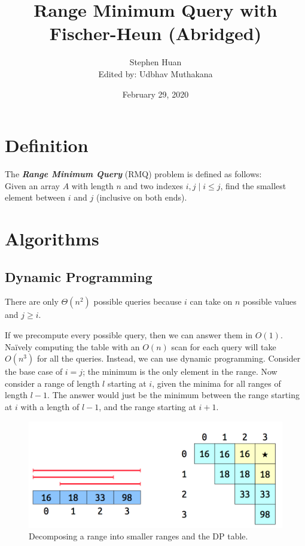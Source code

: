 \documentclass[11pt, oneside]{article}
\title{Range Minimum Query with Fischer-Heun (Abridged)}
\author{Stephen Huan\\ Edited by: Udbhav Muthakana}
\date{February 29, 2020}
\newcommand{\emphasis}[1]{\textbf{\textit{#1}}}
\begin{document}
\maketitle

\section{Definition}

The \emphasis{Range Minimum Query} (RMQ) problem is defined as follows: \\
Given an array \( A \) with length \( n \) and two indexes \( i, j \mid i \leq j \),
find the smallest element between \( i \) and \( j \) (inclusive on both ends).

\section{Algorithms}
\subsection{Dynamic Programming}

There are only \( \Theta(n^2) \) possible queries because \( i \) can take on \( n \) possible values
and \( j \geq i \).

If we precompute every possible query, then we can answer them in \( O(1) \). Naïvely computing the table
with an \( O(n) \) scan for each query will take \( O(n^3) \) for all the queries.
Instead, we can use dynamic programming. Consider the base case of \( i = j \);
the minimum is the only element in the range. Now consider a range of length \( l \) starting
at \( i \), given the minima for all ranges of length \( l - 1 \).
The answer would just be the minimum between the range starting at \( i \) with a length of \( l - 1 \),
and the range starting at \( i + 1 \).

\begin{figure}[h!]
\centering
\includegraphics[scale=0.25]{dp}
\caption{Decomposing a range into smaller ranges and the DP table.}
\end{figure}
\end{document}
